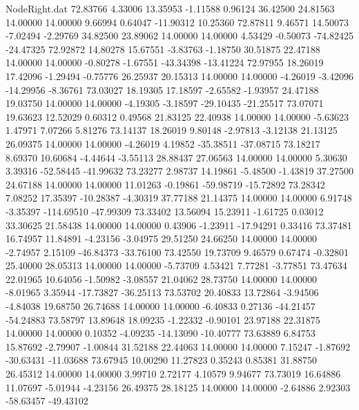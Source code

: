 \begin{filecontents}{NodeRight.dat}
  72.83766    4.33006   13.35953    -1.11588    0.96124   36.42500   24.81563   14.00000   14.00000    9.66994    0.64047  -11.90312   10.25360
  72.87811    9.46571   14.50073    -7.02494   -2.29769   34.82500   23.89062   14.00000   14.00000    4.53429   -0.50073  -74.82425  -24.47325
  72.92872   14.80278   15.67551    -3.83763   -1.18750   30.51875   22.47188   14.00000   14.00000   -0.80278   -1.67551  -43.34398  -13.41224
  72.97955   18.26019   17.42096    -1.29494   -0.75776   26.25937   20.15313   14.00000   14.00000   -4.26019   -3.42096  -14.29956   -8.36761
  73.03027   18.19305   17.18597    -2.65582   -1.93957   24.47188   19.03750   14.00000   14.00000   -4.19305   -3.18597  -29.10435  -21.25517
  73.07071   19.63623   12.52029     0.60312    0.49568   21.83125   22.40938   14.00000   14.00000   -5.63623    1.47971    7.07266    5.81276
  73.14137   18.26019    9.80148    -2.97813   -3.12138   21.13125   26.09375   14.00000   14.00000   -4.26019    4.19852  -35.38511  -37.08715
  73.18217    8.69370   10.60684    -4.44644   -3.55113   28.88437   27.06563   14.00000   14.00000    5.30630    3.39316  -52.58445  -41.99632
  73.23277    2.98737   14.19861    -5.48500   -1.43819   37.27500   24.67188   14.00000   14.00000   11.01263   -0.19861  -59.98719  -15.72892
  73.28342    7.08252   17.35397   -10.28387   -4.30319   37.77188   21.14375   14.00000   14.00000    6.91748   -3.35397 -114.69510  -47.99309
  73.33402   13.56094   15.23911    -1.61725    0.03012   33.30625   21.58438   14.00000   14.00000    0.43906   -1.23911  -17.94291    0.33416
  73.37481   16.74957   11.84891    -4.23156   -3.04975   29.51250   24.66250   14.00000   14.00000   -2.74957    2.15109  -46.84373  -33.76100
  73.42550   19.73709    9.46579     0.67474   -0.32801   25.40000   28.05313   14.00000   14.00000   -5.73709    4.53421    7.77281   -3.77851
  73.47634   22.01965   10.64056    -1.50982   -3.08557   21.04062   28.73750   14.00000   14.00000   -8.01965    3.35944  -17.73827  -36.25113
  73.53702   20.40833   13.72864    -3.94506   -4.84038   19.68750   26.74688   14.00000   14.00000   -6.40833    0.27136  -44.21457  -54.24883
  73.58797   13.89648   18.09235    -1.22332   -0.90101   23.97188   22.31875   14.00000   14.00000    0.10352   -4.09235  -14.13090  -10.40777
  73.63889    6.84753   15.87692    -2.79907   -1.00844   31.52188   22.44063   14.00000   14.00000    7.15247   -1.87692  -30.63431  -11.03688
  73.67945   10.00290   11.27823     0.35243    0.85381   31.88750   26.45312   14.00000   14.00000    3.99710    2.72177    4.10579    9.94677
  73.73019   16.64886   11.07697    -5.01944   -4.23156   26.49375   28.18125   14.00000   14.00000   -2.64886    2.92303  -58.63457  -49.43102

\end{filecontents}

